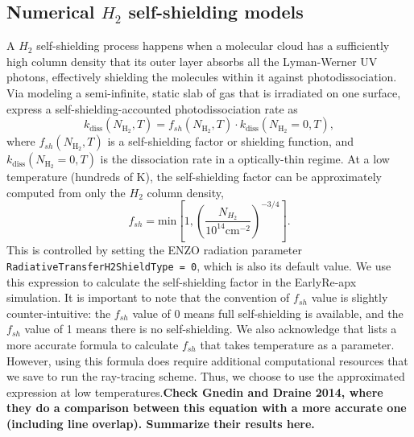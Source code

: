 \documentclass[linenumbers, twocolumn]{aastex631}
\begin{document}


\subsection{Numerical $H_{2}$ self-shielding models}

A $H_{2}$ self-shielding process happens when a molecular cloud has a sufficiently high column density that its outer layer absorbs all the Lyman-Werner UV photons, effectively shielding the molecules within it against photodissociation. Via modeling a semi-infinite, static slab of gas that is irradiated on one surface, \cite{Draine+1996} express a self-shielding-accounted photodissociation rate as
\begin{equation}
    k_{\text{diss}}(N_{\text{H}_{2}},T) = f_{sh}(N_{\text{H}_{2}},T)\cdot k_{\text{diss}}(N_{\text{H}_{2}}=0,T),
\end{equation}
where $f_{sh}(N_{\text{H}_{2}},T)$ is a self-shielding factor or shielding function, and $k_{\text{diss}}(N_{\text{H}_{2}}=0,T)$ is the dissociation rate in a optically-thin regime. At a low temperature (hundreds of K), the self-shielding factor can be approximately computed from only the $H_{2}$ column density, 
\begin{equation}
    f_{sh} = \text{min}\left[1, \left( \frac{N_{H_{2}}}{10^{14}\text{cm}^{-2}}     \right)^{-3/4} \right].
\label{eq:self_shielding_factor_eq}
\end{equation}
This is controlled by setting the ENZO radiation parameter \texttt{RadiativeTransferH2ShieldType = 0}, which is also its default value. We use this expression to calculate the self-shielding factor in the EarlyRe-apx simulation. It is important to note that the convention of $f_{sh}$ value is slightly counter-intuitive: the $f_{sh}$ value of 0 means full self-shielding is available, and the $f_{sh}$ value of 1 means there is no self-shielding. We also acknowledge that \cite{Draine+1996} lists a more accurate formula to calculate $f_{sh}$ that takes temperature as a parameter. However, using this formula does require additional computational resources that we save to run the ray-tracing scheme. Thus, we choose to use the approximated expression at low temperatures.\textbf{Check Gnedin and Draine 2014, where they do a comparison between this equation with a more accurate one (including line overlap). Summarize their results here.}
\end{document}
